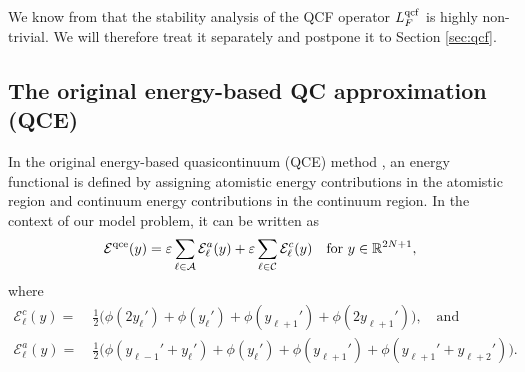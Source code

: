 \documentclass[12pt,reqno]{amsart}
\begin{document}
We know from \cite{sharpstabilityqcf} that the stability analysis of
the QCF operator ${L^{{\rm qcf}}_F}$ is highly non-trivial. We will therefore
treat it separately and postpone it to Section \ref{sec:qcf}.

\subsection{The original energy-based QC approximation (QCE)}
In the original energy-based quasicontinuum (QCE) method
\cite{Ortiz:1996a}, an energy functional is defined by assigning
atomistic energy contributions in the atomistic region and continuum
energy contributions in the continuum region. In the context of our
model problem, it can be written as
\begin{equation}\label{qce.equation}
  {{\mathcal{E}}^{{\rm qce}}}(y) = {\varepsilon} \sum_{\ell \in {\mathcal{A}}} {\mathcal{E}}_\ell^a(y)
  + {\varepsilon} \sum_{\ell \in {\mathcal{C}}} {\mathcal{E}}_\ell^c(y) \quad \text{for } y \in {\mathbb{R}}^{2N+1},
\end{equation}
where
\begin{align*}
  {\mathcal{E}}_\ell^c(y) =~& {{\textstyle \frac{1}{2}}} \big( \phi(2y_\ell') + \phi(y_\ell') + \phi(y_{\ell+1}') + \phi(2y_{\ell+1}') \big), \quad \text{and} \\
  {\mathcal{E}}_\ell^a(y) =~& {{\textstyle \frac{1}{2}}} \big( \phi(y_{\ell-1}' + y_\ell') + \phi(y_\ell') + \phi(y_{\ell+1}') + \phi(y_{\ell+1}' + y_{\ell+2}') \big).
\end{align*}
\end{document}
